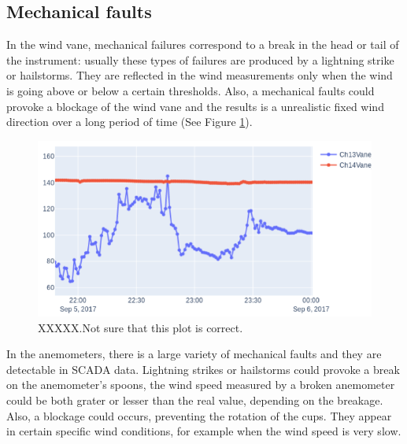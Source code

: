 \documentclass[journal]{IEEEtran}
\begin{document}
\subsection{Mechanical faults}
In the wind vane, mechanical failures correspond to a break in the head or tail of the instrument: usually these types of failures are produced by a lightning strike or hailstorms. They are reflected in the wind measurements only when the wind is going above or below a certain thresholds. Also, a mechanical faults could provoke a blockage of the wind vane and the results is a unrealistic fixed wind direction over a long period of time (See Figure \ref{fig:mechanicalfaults}).
\begin{figure}[h]
	\centering
	\includegraphics[width=\columnwidth]{Images/MechanicalFaults.png}
	\caption{XXXXX.Not sure that this plot is correct.}
	\label{fig:mechanicalfaults}
\end{figure}
In the anemometers, there is a large variety of mechanical faults and they are detectable in SCADA data. Lightning strikes or hailstorms could provoke a break on the anemometer's spoons, the wind speed measured by a broken anemometer could be both grater or lesser than the real value, depending on the breakage. Also, a blockage could occurs, preventing the rotation of the cups. They appear in certain specific wind conditions, for example when the wind speed is very slow.
\end{document}
